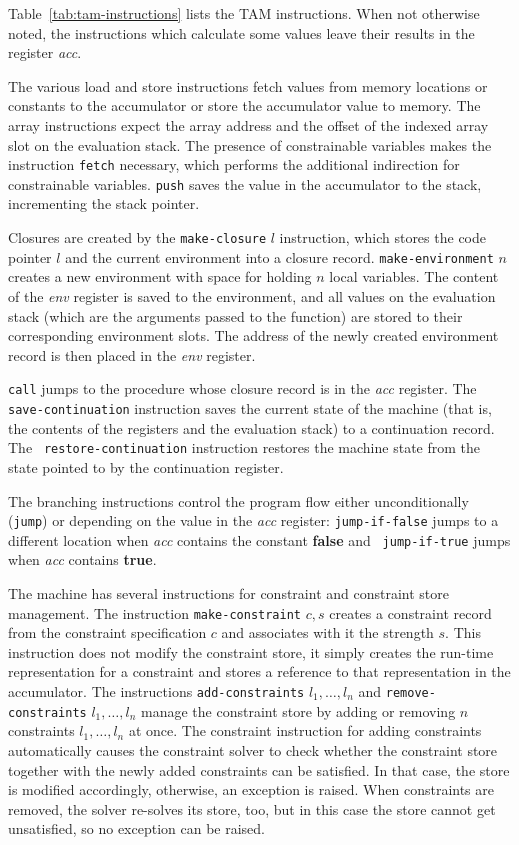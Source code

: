 Table~\ref{tab:tam-instructions} lists the TAM instructions.  When not
otherwise noted, the instructions which calculate some values leave
their results in the register {\em acc}.

The various load and store instructions fetch values from memory
locations or constants to the accumulator or store the accumulator
value to memory.  The array instructions expect the array address and
the offset of the indexed array slot on the evaluation stack.  The
presence of constrainable variables makes the instruction {\tt fetch}
necessary, which performs the additional indirection
for constrainable variables. {\tt push} saves the value in the
accumulator to the stack, incrementing the stack pointer.

Closures are created by the {\tt make-closure} $l$ instruction, which
stores the code pointer $l$ and the current environment into a closure
record.  {\tt make-environment} $n$ creates a new environment with
space for holding $n$ local variables. The content of the {\em env}
register is saved to the environment, and all values on the evaluation
stack (which are the arguments passed to the function) are stored to
their corresponding environment slots.  The address of the newly
created environment record is then placed in the {\em env} register.

{\tt call} jumps to the procedure whose closure record is in the {\em
  acc} register.  The {\tt save-con\-tinuation} instruction saves the
current state of the machine (that is, the contents of the registers
and the evaluation stack) to a continuation record.  The {\tt
  restore-continuation} instruction restores the machine state from
the state pointed to by the continuation register.

The branching instructions control the program flow either
unconditionally ({\tt jump}) or depending on the value in the {\em
  acc} register: {\tt jump-if-false} jumps to a different location
when {\em acc} contains the constant {\bf false} and {\tt
  jump-if-true} jumps when {\em acc} contains {\bf true}.

The machine has several instructions for constraint and constraint
store management.  The instruction {\tt make-constraint} $c, s$
creates a constraint record from the constraint specification $c$ and
associates with it the strength $s$.  This instruction does not modify
the constraint store, it simply creates the run-time representation
for a constraint and stores a reference to that representation in the
accumulator.  The instructions {\tt add-constraints} $l_1,\dots,l_n$
and {\tt remove-constraints} $l_1,\dots,l_n$ manage the constraint
store by adding or removing $n$ constraints $l_1,\dots,l_n$ at once.
The constraint instruction for adding constraints automatically causes
the constraint solver to check whether the constraint store together
with the newly added constraints can be satisfied.  In that case, the
store is modified accordingly, otherwise, an exception is raised.
When constraints are removed, the solver re-solves its store, too, but
in this case the store cannot get unsatisfied, so no exception can be
raised.

